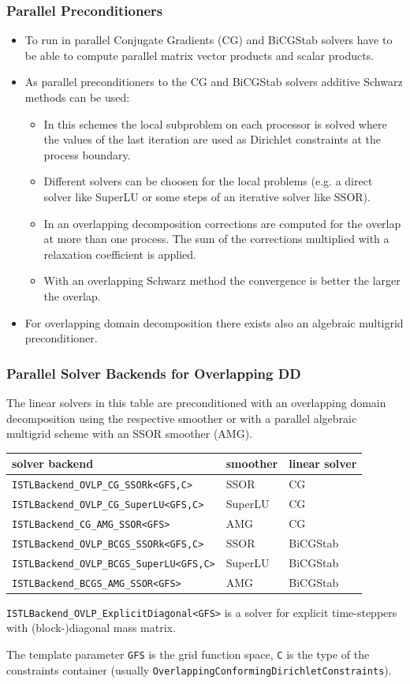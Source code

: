 \begin{frame}
\frametitle{Parallel Preconditioners}
\begin{itemize}
\item To run in parallel Conjugate Gradients (CG) and BiCGStab solvers have to be able to compute parallel matrix vector
products and scalar products.
\item As parallel preconditioners to the CG and BiCGStab solvers additive Schwarz methods can be used:
\begin{itemize}
\item In this schemes the local subproblem on each processor is solved
where the values of the last iteration are used as Dirichlet constraints at the process boundary. 
\item Different solvers can be choosen for the local problems (e.g. a direct solver like SuperLU or some steps of an 
iterative solver like SSOR).
\item In an overlapping decomposition corrections are computed for the overlap at more than one process. The sum of the corrections multiplied with a relaxation 
coefficient is applied. 
\item With an overlapping Schwarz method the convergence is better the larger the overlap.
\end{itemize}
\item For overlapping domain decomposition there exists also an algebraic multigrid preconditioner.
\end{itemize}
\end{frame}


\begin{frame}
  \frametitle{Parallel Solver Backends for Overlapping DD}
The linear solvers in this table are preconditioned with an overlapping domain decomposition
using the respective smoother or with a parallel algebraic multigrid scheme with an SSOR smoother (AMG).
\begin{center}
\begin{tabular}{|l|l|l|}\hline
solver backend & smoother & linear solver\\\hline
\lstinline!ISTLBackend_OVLP_CG_SSORk<GFS,C>! & SSOR & CG\\\hline
\lstinline!ISTLBackend_OVLP_CG_SuperLU<GFS,C>! & SuperLU & CG\\\hline
\lstinline!ISTLBackend_CG_AMG_SSOR<GFS>! & AMG & CG\\\hline
\lstinline!ISTLBackend_OVLP_BCGS_SSORk<GFS,C>! & SSOR & BiCGStab\\\hline
\lstinline!ISTLBackend_OVLP_BCGS_SuperLU<GFS,C>! & SuperLU & BiCGStab\\\hline
\lstinline!ISTLBackend_BCGS_AMG_SSOR<GFS>! & AMG & BiCGStab\\\hline
\end{tabular}
\end{center}
\lstinline!ISTLBackend_OVLP_ExplicitDiagonal<GFS>! is a solver for explicit 
time-steppers with (block-)diagonal mass matrix.

The template parameter \lstinline!GFS! is the grid function space, \lstinline!C! is the type of the 
constraints container (usually \lstinline!OverlappingConformingDirichletConstraints!).
\end{frame}

